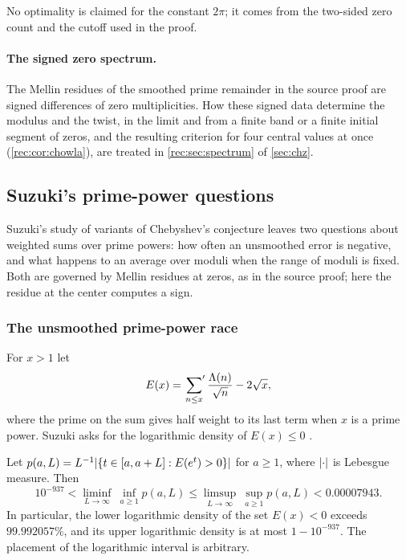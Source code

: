 No optimality is claimed for the constant $2\pi$; it comes from the two-sided zero count and
the cutoff used in the proof.

\paragraph{The signed zero spectrum.}
The Mellin residues of the smoothed prime remainder in the source proof are signed
differences of zero multiplicities. How these signed data determine the modulus and the
twist, in the limit and from a finite band or a finite initial segment of zeros, and the
resulting criterion for four central values at once (\cref{rec:cor:chowla}), are treated in
\cref{rec:sec:spectrum} of \cref{sec:chz}.

\subsection{Suzuki's prime-power questions}\label{zer:sec:suzuki}

Suzuki's study of variants of Chebyshev's conjecture \cite{Suzuki2025Variants} leaves two
questions about weighted sums over prime powers: how often an unsmoothed error is negative,
and what happens to an average over moduli when the range of moduli is fixed. Both are
governed by Mellin residues at zeros, as in the source proof; here the residue at the
center computes a sign.

\subsubsection{The unsmoothed prime-power race}
For $x>1$ let
\[
 E(x)=\sideset{}{'}\sum_{n\le x}\frac{\Lambda(n)}{\sqrt n}-2\sqrt x ,
\]
where the prime on the sum gives half weight to its last term when $x$ is a prime power.
Suzuki asks for the logarithmic density of $E(x)\le0$
\cite[\S1.1, after (6)]{Suzuki2025Variants}.

\begin{theorem}[\stG]\label{zer:thm:suzukidensity}
Let $p(a,L)=L^{-1}\lvert\{t\in[a,a+L]:E(e^t)>0\}\rvert$ for $a\ge1$, where $\lvert\cdot\rvert$ is
Lebesgue measure. Then
\[
 10^{-937}<\liminf_{L\to\infty}\ \inf_{a\ge1}p(a,L)\le
 \limsup_{L\to\infty}\ \sup_{a\ge1}p(a,L)<0.00007943 .
\]
In particular, the lower logarithmic density of the set $E(x)<0$ exceeds $99.992057\%$, and
its upper logarithmic density is at most $1-10^{-937}$. The placement of the logarithmic
interval is arbitrary.
\end{theorem}

